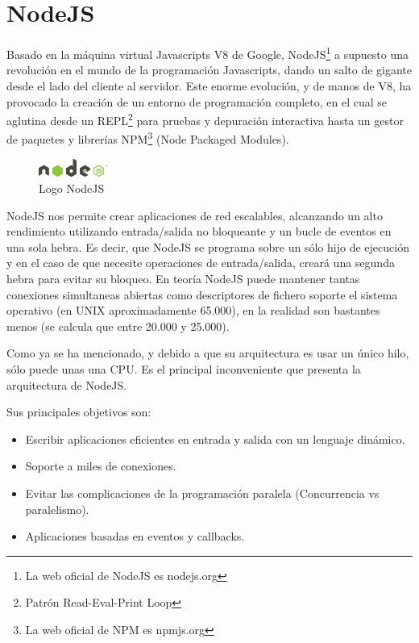 \section{NodeJS}

Basado en la máquina virtual Javascripts V8 de Google, NodeJS\footnote{La web oficial de NodeJS es nodejs.org} a supuesto una revolución en el mundo de la programación Javascripts, dando un salto de gigante desde el lado del cliente al servidor. Este enorme evolución, y de manos de V8, ha provocado la creación de un entorno de programación completo, en el cual se aglutina desde un REPL\footnote{Patrón Read-Eval-Print Loop} para pruebas y depuración interactiva hasta un gestor de paquetes y librerías NPM\footnote{La web oficial de NPM es npmjs.org} (Node Packaged Modules).

\begin{figure}
  \begin{center}
    \includegraphics[width=0.2\textwidth]{imagenes/nodejs-light}
  \end{center}
  \caption{Logo NodeJS}
  \label{fig:nodejs}
\end{figure}

NodeJS nos permite crear aplicaciones de red escalables, alcanzando un alto rendimiento utilizando entrada/salida no bloqueante y un bucle de eventos en una sola hebra. Es decir, que NodeJS se programa sobre un sólo hijo de ejecución y en el caso de que necesite operaciones de entrada/salida, creará una segunda hebra para evitar su bloqueo. En teoría NodeJS puede mantener tantas conexiones simultaneas abiertas como descriptores de fichero soporte el sistema operativo (en UNIX aproximadamente 65.000), en la realidad son bastantes menos (se calcula que entre 20.000 y 25.000). 

Como ya se ha mencionado, y debido a que su arquitectura es usar un único hilo, sólo puede unas una CPU. Es el principal inconveniente que presenta la arquitectura de NodeJS.

Sus principales objetivos son:
\begin{itemize}
\item Escribir aplicaciones eficientes en entrada y salida con un lenguaje dinámico.
\item Soporte a miles de conexiones.
\item Evitar las complicaciones de la programación paralela (Concurrencia vs paralelismo).
\item Aplicaciones basadas en eventos y callbacks.
\end{itemize}

